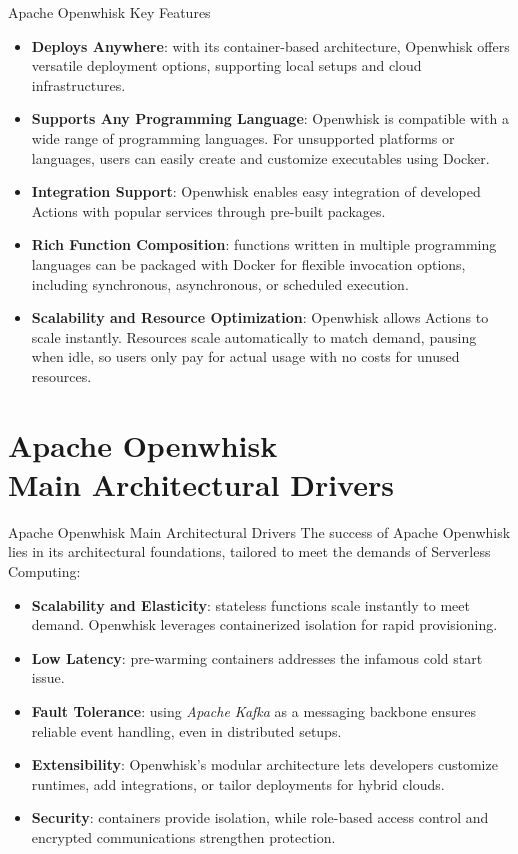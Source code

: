 \documentclass[aspectratio=169]{beamer}
\begin{document}
\begin{frame}{Apache Openwhisk Key Features}
\begin{itemize}
    \item \textbf{Deploys Anywhere}: with its container-based architecture, Openwhisk offers versatile deployment options, supporting local setups and cloud infrastructures.
    \item \textbf{Supports Any Programming Language}: Openwhisk is compatible with a wide range of programming languages. For unsupported platforms or languages, users can easily create and customize executables using Docker.
    \item \textbf{Integration Support}: Openwhisk enables easy integration of developed Actions with popular services through pre-built packages.
    \item \textbf{Rich Function Composition}: functions written in multiple programming languages can be packaged with Docker for flexible invocation options, including synchronous, asynchronous, or scheduled execution.
    \item \textbf{Scalability and Resource Optimization}: Openwhisk allows Actions to scale instantly. Resources scale automatically to match demand, pausing when idle, so users only pay for actual usage with no costs for unused resources.
\end{itemize}
\end{frame}

\section{Apache Openwhisk \\Main Architectural Drivers}
\begin{frame}{Apache Openwhisk Main Architectural Drivers}
The success of Apache Openwhisk lies in its architectural foundations, tailored to meet the demands of Serverless Computing:
\begin{itemize}
    \item \textbf{Scalability and Elasticity}: stateless functions scale instantly to meet demand. Openwhisk leverages containerized isolation for rapid provisioning.
    \item \textbf{Low Latency}: pre-warming containers addresses the infamous cold start issue.
    \item \textbf{Fault Tolerance}: using \textit{Apache Kafka} as a messaging backbone ensures reliable event handling, even in distributed setups.
    \item \textbf{Extensibility}: Openwhisk’s modular architecture lets developers customize runtimes, add integrations, or tailor deployments for hybrid clouds.
    \item \textbf{Security}: containers provide isolation, while role-based access control and encrypted communications strengthen protection.
\end{itemize}
\end{frame}
\end{document}
